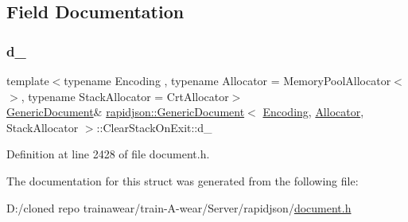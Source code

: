 \subsection{Field Documentation}
\mbox{\label{structrapidjson_1_1_generic_document_1_1_clear_stack_on_exit_ae8361b4c01cc90187260e77dba565fd1}} 
\subsubsection{\texorpdfstring{d\_}{d\_}}
{\footnotesize\ttfamily template$<$typename Encoding , typename Allocator  = Memory\+Pool\+Allocator$<$$>$, typename Stack\+Allocator  = Crt\+Allocator$>$ \\
\mbox{\hyperlink{classrapidjson_1_1_generic_document}{Generic\+Document}}\& \mbox{\hyperlink{classrapidjson_1_1_generic_document}{rapidjson\+::\+Generic\+Document}}$<$ \mbox{\hyperlink{classrapidjson_1_1_encoding}{Encoding}}, \mbox{\hyperlink{classrapidjson_1_1_allocator}{Allocator}}, Stack\+Allocator $>$\+::Clear\+Stack\+On\+Exit\+::d\+\_\+\hspace{0.3cm}{\ttfamily [private]}}



Definition at line 2428 of file document.\+h.



The documentation for this struct was generated from the following file\+:\begin{DoxyCompactItemize}
\item 
D\+:/cloned repo trainawear/train-\/\+A-\/wear/\+Server/rapidjson/\mbox{\hyperlink{document_8h}{document.\+h}}\end{DoxyCompactItemize}
